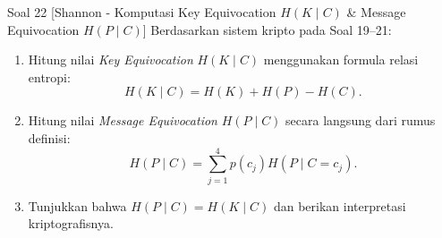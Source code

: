 \documentclass[11pt,a4paper]{article}
\begin{document}

\begin{soalshannon}{Soal 22 [Shannon - Komputasi Key Equivocation $H(K \mid C)$ \& Message Equivocation $H(P \mid C)$]}
Berdasarkan sistem kripto pada Soal 19--21:
\begin{enumerate}[label=(\alph*)]
    \item Hitung nilai \textit{Key Equivocation} $H(K \mid C)$ menggunakan formula relasi entropi:
    \[
    H(K \mid C) = H(K) + H(P) - H(C).
    \]
    \item Hitung nilai \textit{Message Equivocation} $H(P \mid C)$ secara langsung dari rumus definisi:
    \[
    H(P \mid C) = \sum_{j=1}^4 p(c_j) H(P \mid C = c_j).
    \]
    \item Tunjukkan bahwa $H(P \mid C) = H(K \mid C)$ dan berikan interpretasi kriptografisnya.
\end{enumerate}
\end{soalshannon}
\end{document}
